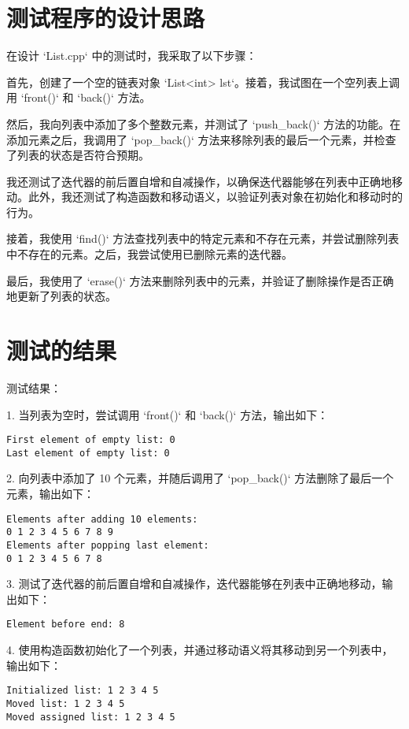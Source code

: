 \documentclass[UTF8]{ctexart}
\begin{document}
\pagestyle{fancy}
\fancyhead{}

\section{测试程序的设计思路}

在设计 `List.cpp` 中的测试时，我采取了以下步骤：

首先，创建了一个空的链表对象 `List<int> lst`。接着，我试图在一个空列表上调用 `front()` 和 `back()` 方法。

然后，我向列表中添加了多个整数元素，并测试了 `push\_back()` 方法的功能。在添加元素之后，我调用了 `pop\_back()` 方法来移除列表的最后一个元素，并检查了列表的状态是否符合预期。

我还测试了迭代器的前后置自增和自减操作，以确保迭代器能够在列表中正确地移动。此外，我还测试了构造函数和移动语义，以验证列表对象在初始化和移动时的行为。

接着，我使用 `find()` 方法查找列表中的特定元素和不存在元素，并尝试删除列表中不存在的元素。之后，我尝试使用已删除元素的迭代器。

最后，我使用了 `erase()` 方法来删除列表中的元素，并验证了删除操作是否正确地更新了列表的状态。


\section{测试的结果}

测试结果：

1. 当列表为空时，尝试调用 `front()` 和 `back()` 方法，输出如下：
\begin{verbatim}
First element of empty list: 0
Last element of empty list: 0
\end{verbatim}

2. 向列表中添加了 10 个元素，并随后调用了 `pop\_back()` 方法删除了最后一个元素，输出如下：
\begin{verbatim}
Elements after adding 10 elements:
0 1 2 3 4 5 6 7 8 9 
Elements after popping last element:
0 1 2 3 4 5 6 7 8
\end{verbatim}

3. 测试了迭代器的前后置自增和自减操作，迭代器能够在列表中正确地移动，输出如下：
\begin{verbatim}
Element before end: 8 
\end{verbatim}

4. 使用构造函数初始化了一个列表，并通过移动语义将其移动到另一个列表中，输出如下：
\begin{verbatim}
Initialized list: 1 2 3 4 5 
Moved list: 1 2 3 4 5 
Moved assigned list: 1 2 3 4 5 
\end{verbatim}
\end{document}
